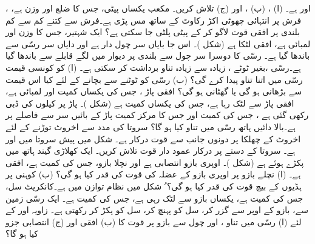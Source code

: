 ، اور  ہے۔ (ا)  ، (ب)  ، اور (ج)  تلاش کریں۔
مکعب یکساں پیٹی، جس کا ضلع   اور وزن  ہے،   فرش پر   انتہائی چھوٹی   اکڑ رکاوٹ کے ساتھ مس  پڑی ہے۔فرش سے کتنے کم سے کم بلندی پر   افقی قوت لاگو کر کے پیٹی پلٹی جا سکتی ہے؟
ایک شہتیر، جس کا وزن  اور لمبائی  ہے، افقی لٹکا ہے  (شکل )۔  اس جا بایاں سر چول دار ہے اور دایاں سر رسّی سے باندھا گیا ہے۔ رسّی کا دوسرا سر چول سے  بلندی پر دیوار میں لگے قابلے  سے  باندھا گیا ہے۔رسّی ،بغیر ٹوٹے   ، زیادہ سے زیادہ  تناو  برداشت کر سکتی  ہے۔ (ا)   کو کونسی قیمت رسّی میں اتنا تناو پیدا کرے گی؟ (ب)  رسّی کو  ٹوٹنے سے   بچانے کے لئے  کیا     اس قیمت سے بڑھانی ہو گی یا گھٹانی ہو گی؟
افقی پاڑ  ، جس کی یکساں کمیت  اور لمبائی   ہے، افقی پاڑ  سے لٹک رہا ہے، جس کی  یکساں کمیت   ہے (شکل )۔ پاڑ  پر  کیلوں کی ڈبی رکھی گئی ہے ،   جس کی کمیت  اور جس کا مرکز کمیت پاڑ کے بائیں سر سے  فاصلے پر ہے۔بالا دائیں  ہاتھ   رسّی میں تناو  کیا ہو گا؟
سروتا کی مدد سے  اخروٹ  توڑنے کے لئے  اخروٹ کے چھلکا پر دونوں جانب سے  قوت درکار ہے۔ شکل   میں پیش سروتا  میں   اور  ہے۔ سروتا کے دستے پر  درکار عمود دار قوت  تلاش کریں۔
ایک کھلاڑی  گیند ہاتھ میں پکڑے  ہوئے ہے (شکل )۔ اوپری  بازو    انتصابی ہے  اور نچلا بازو، جس کی  کمیت  ہے، افقی ہے۔ (ا)  نچلے بازو   پر اوپری   بازو کے عضلہ  کی قوت  کی قدر کیا ہو گی؟ (ب)  کوہنی  پر ہڈیوں کے بیچ قوت کی قدر کیا ہو گی؟
ُ
شکل  میں  نظام توازن میں ہے۔کانکریٹ سل، جس کی کمیت  ہے، یکساں  بازو  سے لٹک رہی ہے، جس کی کمیت  ہے۔ ایک رسّی  زمین سے، بازو کے اوپر سے گزر کر، سل کو پہنچ کر، سل کو پکڑ کر رکھتی ہے۔ زاویہ   
اور  کے لئے  (ا)  رسّی میں تناو  ، اور  چول سے بازو پر قوت کا  (ب) افقی اور (ج) انتصابی جزو کیا ہو گا؟
